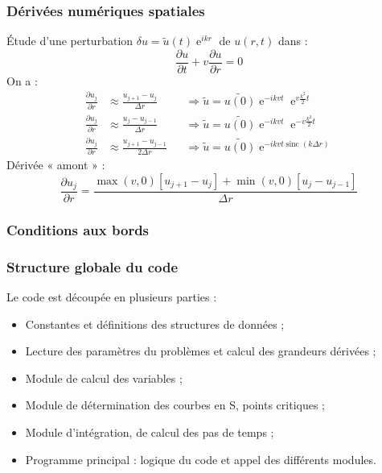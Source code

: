 \documentclass[french]{beamer}
\DeclareMathOperator{\sinc}{sinc}
\DeclareMathOperator{\e}{e}
\begin{document}
\begin{frame}
    \frametitle{Dérivées numériques spatiales}
    Étude d’une perturbation $\delta{u} = \tilde{u}(t) \e^{ikr}$ de $u(r,t)$ dans :
    \begin{equation*}
        \frac{\partial u}{\partial t} + v \frac{\partial u}{\partial r} = 0
    \end{equation*}
    On a :
    \begin{align*}
        \frac{\partial u_j}{\partial r} &\approx \frac{u_{j+1} - u_j    }{  \Delta{r}} &&\Rightarrow \tilde{u} = \tilde{u(0)} \e^{-i k v t} \e^{ v\frac{k^2}{2}t}\\
        \frac{\partial u_j}{\partial r} &\approx \frac{u_j     - u_{j-1}}{  \Delta{r}} &&\Rightarrow \tilde{u} = \tilde{u(0)} \e^{-i k v t} \e^{-v\frac{k^2}{2}t}\\
        \frac{\partial u_j}{\partial r} &\approx \frac{u_{j+1} - u_{j-1}}{2 \Delta{r}} &&\Rightarrow \tilde{u} = \tilde{u(0)} \e^{-i k v t \sinc(k \Delta{r})}
    \end{align*}
    Dérivée « amont » :
    \begin{equation*}
        \frac{\partial u_j}{\partial r} = \frac{\max(v,0) \left[u_{j+1} - u_j \right] + \min(v,0) \left[u_j - u_{j-1}\right]}{\Delta{r}}
    \end{equation*}
\end{frame}

\begin{frame}
    \frametitle{Conditions aux bords}
\end{frame}



\begin{frame}
    \frametitle{Structure globale du code}
    Le code est découpée en plusieurs parties :
    \begin{itemize}
        \item Constantes et définitions des structures de données ;
        \item Lecture des paramètres du problèmes et calcul des grandeurs dérivées ;
        \item Module de calcul des variables ;
        \item Module de détermination des courbes en S, points critiques ;
        \item Module d’intégration, de calcul des pas de temps ;
        \item Programme principal : logique du code et appel des différents modules.
    \end{itemize}
\end{frame}
\end{document}

